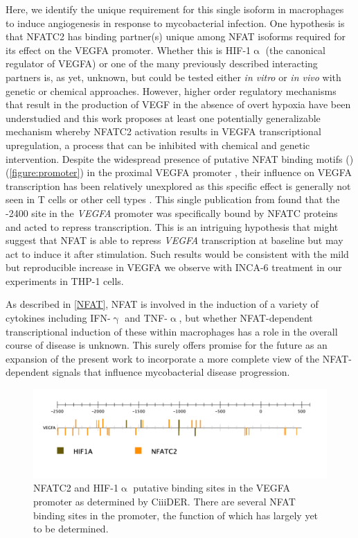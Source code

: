 Here, we identify the unique requirement for this single isoform in macrophages to induce angiogenesis in response to mycobacterial infection. One hypothesis is that NFATC2 has binding partner(s) unique among NFAT isoforms required for its effect on the VEGFA promoter. Whether this is HIF-1$\upalpha$ (the canonical regulator of VEGFA) or one of the many previously described interacting partners is, as yet, unknown, but could be tested either \textit{in vitro} or \textit{in vivo} with genetic or chemical approaches. However, higher order regulatory mechanisms that result in the production of VEGF in the absence of overt hypoxia have been understudied and this work proposes at least one potentially generalizable mechanism whereby NFATC2 activation results in VEGFA transcriptional upregulation, a process that can be inhibited with chemical and genetic intervention. Despite the widespread presence of putative NFAT binding motifs () (\autoref{figure:promoter}) in the proximal VEGFA promoter \citep{Gearing2019}, their influence on VEGFA transcription has been relatively unexplored as this specific effect is generally not seen in T cells or other cell types \citep{Chang2004}. This single publication from \citet{Chang2004} found that the -2400 site in the \textit{VEGFA} promoter was specifically bound by NFATC proteins and acted to repress transcription. This is an intriguing hypothesis that might suggest that NFAT is able to repress \textit{VEGFA} transcription at baseline but may act to induce it after stimulation. Such results would be consistent with the mild but reproducible increase in VEGFA we observe with INCA-6 treatment in our experiments in THP-1 cells. 

As described in \autoref{NFAT}, NFAT is involved in the induction of a variety of cytokines including IFN-$\upgamma$ and TNF-$\upalpha$, but whether NFAT-dependent transcriptional induction of these within macrophages has a role in the overall course of disease is unknown. This surely offers promise for the future as an expansion of the present work to incorporate a more complete view of the NFAT-dependent signals that influence mycobacterial disease progression.

\begin{figure}
\centering
\includegraphics[width=\textwidth]{images/vegfapromoter.pdf}
\caption{NFATC2 and HIF-1$\upalpha$ putative binding sites in the VEGFA promoter as determined by CiiiDER. There are several NFAT binding sites in the promoter, the function of which has largely yet to be determined.}
\label{figure:promoter}
\end{figure}

